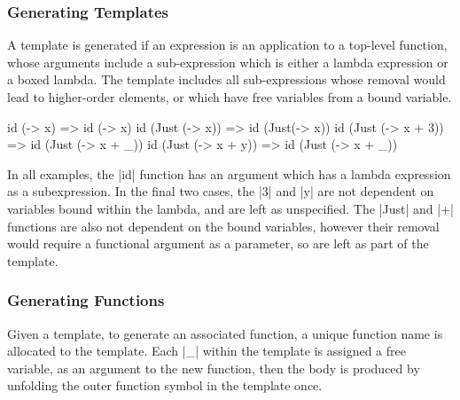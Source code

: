 \documentclass[preprint]{sigplanconf}
\begin{document}
\subsubsection{Generating Templates}

A template is generated if an expression is an application to a top-level function, whose arguments include a sub-expression which is either a lambda expression or a boxed lambda. The template includes all sub-expressions whose removal would lead to higher-order elements, or which have free variables from a bound variable.

\begin{example}
\ignore\begin{code}
id (\x -> x)             => id (\x -> x)
id (Just (\x -> x))      => id (Just(\x -> x))
id (Just (\x -> x + 3))  => id (Just (\x -> x + _))
id (Just (\x -> x + y))  => id (Just (\x -> x + _))
\end{code}

In all examples, the |id| function has an argument which has a lambda expression as a subexpression. In the final two cases, the |3| and |y| are not dependent on variables bound within the lambda, and are left as unspecified.  The |Just| and |+| functions are also not dependent on the bound variables, however their removal would require a functional argument as a parameter, so are left as part of the template.
\end{example}

\subsubsection{Generating Functions}

Given a template, to generate an associated function, a unique function name is allocated to the template. Each |_| within the template is assigned a free variable, as an argument to the new function, then the body is produced by unfolding the outer function symbol in the template once.
\end{document}
